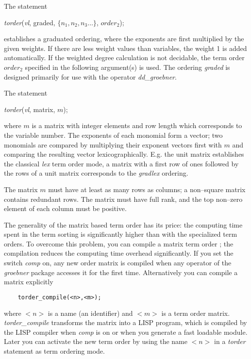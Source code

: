  
The statement
\begin{center}
{\it torder}(\emph{vl}, graded, $\{n_1,n_2,n_3 \ldots\}$, $order_2$);
\end{center}
establishes a graduated ordering, where the exponents are first
multiplied by the given weights. If there are less weight values than
variables, the weight 1 is added automatically. If the weighted
degree calculation is not decidable, the term order $order_2$ specified
in the following argument(s) is used.  The ordering \emph{graded} is designed
primarily for use with the operator \emph{dd\_groebner}.

 
The statement
\begin{center}
{\it torder}(\emph{vl}, matrix, $m$);
\end{center}
where $m$ is a matrix with integer elements and row length which
corresponds to the variable number. The exponents of each monomial
form a vector; two monomials are compared by multiplying their
exponent vectors first with $m$ and comparing the resulting vector
lexicographically. E.g. the unit matrix establishes the classical
\emph{lex} term order mode, a matrix with a first row of ones followed
by the rows of a unit matrix corresponds to the \emph{gradlex} ordering.

The matrix $m$ must have at least as many rows as columns; a non--square
matrix contains redundant rows. The matrix must have full rank, and
the top non--zero element of each column must be positive.

The generality of the matrix based term order has its price: the
computing time spent in the term sorting is significantly higher
than with the specialized term orders. To overcome this problem,
you can compile a matrix term order ; the
compilation reduces the computing time overhead significantly.
If you set the switch \emph{comp} on,
any new order matrix is compiled
when any operator of the \emph{groebner} package accesses it for the
first time. Alternatively you can compile a matrix explicitly
\hypertarget{operator:TORDER_COMPILE}{}
\begin{verbatim}
    torder_compile(<n>,<m>);
\end{verbatim}
where $<n>$ is a name (an identifier) and $<m>$ is a term order matrix.
\emph{torder\_compile} transforms the matrix into a LISP program, which
is compiled by the LISP compiler when \emph{comp} is on or when you
generate a fast loadable module. Later you can activate the new term
order by using the name $<n>$ in a \emph{torder} statement as term ordering
mode.

